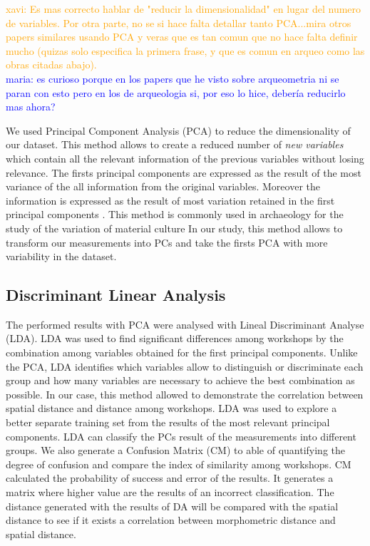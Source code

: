 \documentclass[review]{elsarticle}
\newcommand{\memo}[2]{\textcolor{#1}{#2}}
\newcommand{\xavi}[1]{\memo{orange}{xavi: #1\\}}
\newcommand{\maria}[1]{\memo{blue}{maria: #1\\}}
\begin{document}
\xavi{Es mas correcto hablar de "reducir la dimensionalidad" en lugar del numero de variables. Por otra parte, no se si hace falta detallar tanto PCA...mira otros papers similares usando PCA y veras que es tan comun que no hace falta definir mucho (quizas solo especifica la primera frase, y que es comun en arqueo como las obras citadas abajo).}
\maria{es curioso porque en los papers que he visto sobre arqueometria ni se paran con esto pero en los de arqueologia si, por eso lo hice, debería reducirlo mas ahora?}

We used Principal Component Analysis (PCA) to reduce the dimensionality of our dataset. This method allows to create a reduced number of \textit{new variables} which contain all the relevant information of the previous variables without losing relevance. The firsts principal components are expressed as the result of the most variance of the all information from the original variables. Moreover the information is expressed as the result of most variation retained in the first principal components \citep{jolliffe_principal_2002, shennan_quantifying_1997}. 
This method is commonly used in archaeology for the study of the variation of material culture \citep{li_crossbows_2014, schillinger_differences_2016} 
In our study, this method allows to transform our measurements into PCs and take the firsts PCA with more variability in the dataset.  


\subsection{Discriminant Linear Analysis} 


The performed results with PCA were analysed with Lineal Discriminant Analyse (LDA). LDA was used to find significant differences among workshops by the combination among variables obtained for the first principal components. Unlike the PCA, LDA identifies which variables allow to distinguish or discriminate each group and how many variables are necessary to achieve the best combination as possible. In our case, this method allowed to demonstrate the correlation between spatial distance and distance among workshops. LDA was used to explore a better separate training set from the results of the most relevant principal components. LDA can classify the PCs result of the measurements into different groups.  We also generate a Confusion Matrix (CM) to able of quantifying the degree of confusion and compare the index of similarity among workshops.  CM calculated the probability of success and error of the results. It generates a matrix where higher value are the results of an incorrect classification. The distance generated with the results of DA will be compared with the spatial distance to see if it exists a correlation between morphometric distance and spatial distance. 
\end{document}

